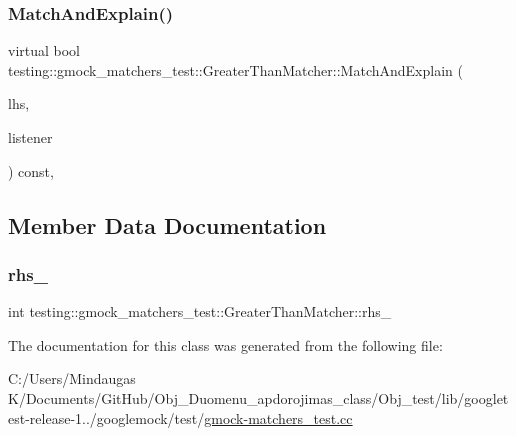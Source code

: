\mbox{\label{classtesting_1_1gmock__matchers__test_1_1_greater_than_matcher_a85a583852003638507d872238bcf7c0f}} 
\subsubsection{\texorpdfstring{MatchAndExplain()}{MatchAndExplain()}}
{\footnotesize\ttfamily virtual bool testing\+::gmock\+\_\+matchers\+\_\+test\+::\+Greater\+Than\+Matcher\+::\+Match\+And\+Explain (\begin{DoxyParamCaption}\item[{int}]{lhs,  }\item[{Match\+Result\+Listener $\ast$}]{listener }\end{DoxyParamCaption}) const\hspace{0.3cm}{\ttfamily [inline]}, {\ttfamily [virtual]}}



\subsection{Member Data Documentation}
\mbox{\label{classtesting_1_1gmock__matchers__test_1_1_greater_than_matcher_aca7d0e0d9127f5c72310fda7be4d5d6c}} 
\subsubsection{\texorpdfstring{rhs\_}{rhs\_}}
{\footnotesize\ttfamily int testing\+::gmock\+\_\+matchers\+\_\+test\+::\+Greater\+Than\+Matcher\+::rhs\+\_\+\hspace{0.3cm}{\ttfamily [private]}}



The documentation for this class was generated from the following file\+:\begin{DoxyCompactItemize}
\item 
C\+:/\+Users/\+Mindaugas K/\+Documents/\+Git\+Hub/\+Obj\+\_\+\+Duomenu\+\_\+apdorojimas\+\_\+class/\+Obj\+\_\+test/lib/googletest-\/release-\/1../googlemock/test/\mbox{\hyperlink{_obj__test_2lib_2googletest-release-1_88_81_2googlemock_2test_2gmock-matchers__test_8cc}{gmock-\/matchers\+\_\+test.\+cc}}\end{DoxyCompactItemize}
